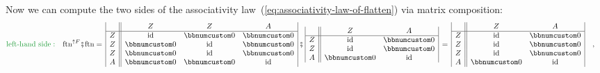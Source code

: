 Now we can compute the two sides of the associativity law~(\ref{eq:associativity-law-of-flatten})
via matrix composition:
\begin{align*}
{\color{greenunder}\text{left-hand side}:}\quad & \text{ftn}^{\uparrow F}\bef\text{ftn}=\,\begin{array}{|c||ccc|}
 & Z & Z & A\\
\hline Z & \text{id} & \bbnum 0 & \bbnum 0\\
Z & \bbnum 0 & \text{id} & \bbnum 0\\
Z & \bbnum 0 & \text{id} & \bbnum 0\\
A & \bbnum 0 & \bbnum 0 & \text{id}
\end{array}\,\bef\,\begin{array}{|c||cc|}
 & Z & A\\
\hline Z & \text{id} & \bbnum 0\\
Z & \text{id} & \bbnum 0\\
A & \bbnum 0 & \text{id}
\end{array}\,=\,\begin{array}{|c||cc|}
 & Z & A\\
\hline Z & \text{id} & \bbnum 0\\
Z & \text{id} & \bbnum 0\\
Z & \text{id} & \bbnum 0\\
A & \bbnum 0 & \text{id}
\end{array}\quad,
\end{align*}
